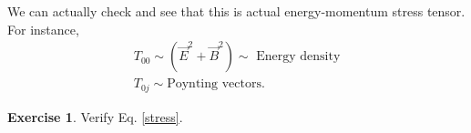 \documentclass{book}
\numberwithin{equation}{section}
\theoremstyle{definition}
\newtheorem{exmp}{Exercise}[section]
\begin{document}
We can actually check and see that this is actual energy-momentum stress tensor. For instance, 
\begin{align}
T_{00} \sim (\vec{E}^2 + \vec{B}^2) \sim \text{ Energy density}\\
T_{0j} \sim \text{Poynting vectors}.
\end{align}




















\begin{exmp}
	Verify Eq. \eqref{stress}.\\
	

\end{exmp}
\end{document}
